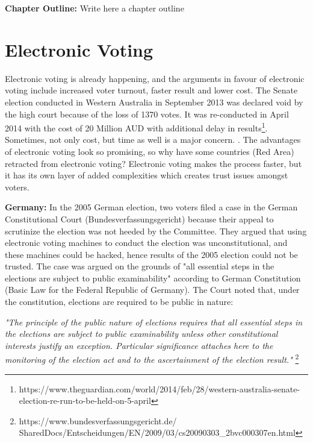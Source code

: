 \textbf{Chapter Outline:}
  Write here a chapter outline
   
\section{Electronic Voting}
  Electronic voting is already happening, and the
  arguments in favour of electronic voting 
  include increased voter turnout, faster result and lower cost. The Senate 
  election conducted in Western Australia in September 2013 was 
  declared void by the high court because of the loss of 1370 votes. It was 
  re-conducted in April 2014 with the cost of 20 Million 
  AUD with additional  delay in results\footnote{https://www.theguardian.com/world/2014/feb/28/western-australia-senate-election-re-run-to-be-held-on-5-april}. Sometimes, 
  not only cost, but time as well is a major concern.
  . 
  The advantages of electronic voting 
  look so promising, so why have some countries (Red Area) retracted 
  from electronic voting? Electronic voting makes 
  the process faster, but it has its own layer of added complexities 
  which creates trust issues amongst voters. 
  
  \textbf{Germany:} In the 2005 German election, two voters filed a case in the German 
  Constitutional Court (Bundesverfassungsgericht) because their 
  appeal to scrutinize the election 
  was not heeded by the Committee. They argued that using electronic 
  voting machines to conduct the election was unconstitutional, and 
  these machines could be hacked, hence results of the 2005 election 
  could not be trusted. The case was argued on the grounds 
  of "all essential steps in the elections are subject to 
  public examinability" according to German Constitution 
  (Basic Law for the Federal Republic of Germany). 
  The Court noted that, under the constitution, elections are 
  required to be public in nature:
  
  \textit{"The principle of the public nature of elections requires that all 
  essential steps in the elections are subject to public examinability
  unless other constitutional interests justify an exception. 
  Particular significance attaches here to the monitoring of the 
  election act and to the ascertainment of the election result."}
  \footnote{https://www.bundesverfassungsgericht.de/
  SharedDocs/Entscheidungen/EN/2009/03/cs20090303\_2bvc000307en.html}
 
